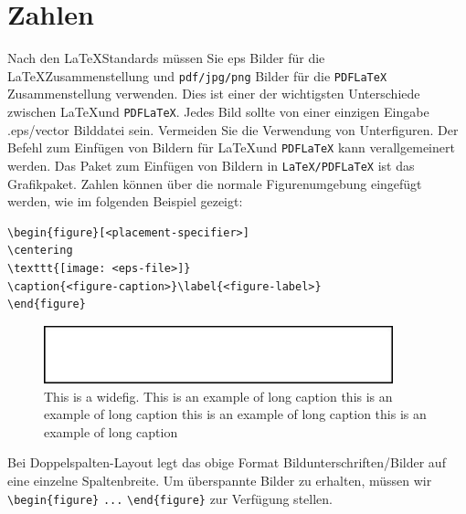 \documentclass[pdflatex,sn-mathphys-num]{sn-jnl}%
\theoremstyle{thmstyleone}%
\theoremstyle{thmstyletwo}%
\theoremstyle{thmstylethree}%
\begin{document}
\section{Zahlen}\label{sec6}

Nach den \LaTeX Standards müssen Sie eps Bilder für die \LaTeX Zusammenstellung und \verb+pdf/jpg/png+ Bilder für die \verb+PDFLaTeX+ Zusammenstellung verwenden. Dies ist einer der wichtigsten Unterschiede zwischen \LaTeX und \verb+PDFLaTeX+. Jedes Bild sollte von einer einzigen Eingabe .eps/vector Bilddatei sein. Vermeiden Sie die Verwendung von Unterfiguren. Der Befehl zum Einfügen von Bildern für \LaTeX und \verb+PDFLaTeX+ kann verallgemeinert werden. Das Paket zum Einfügen von Bildern in \verb+LaTeX/PDFLaTeX+ ist das Grafikpaket. Zahlen können über die normale Figurenumgebung eingefügt werden, wie im folgenden Beispiel gezeigt:

\bigskip\begin{verbatim}
\begin{figure}[<placement-specifier>]
\centering
\texttt{[image: <eps-file>]}
\caption{<figure-caption>}\label{<figure-label>}
\end{figure}
\end{verbatim}
\bigskip%

\begin{figure}[h]
\centering
\includegraphics[width=0.9\textwidth]{fig.eps}
\caption{This is a widefig. This is an example of long caption this is an example of long caption  this is an example of long caption this is an example of long caption}\label{fig1}
\end{figure}

Bei Doppelspalten-Layout legt das obige Format Bildunterschriften/Bilder auf eine einzelne Spaltenbreite. Um überspannte Bilder zu erhalten, müssen wir \verb+\begin{figure}+ \verb+...+ \verb+\end{figure}+ zur Verfügung stellen.
\end{document}
